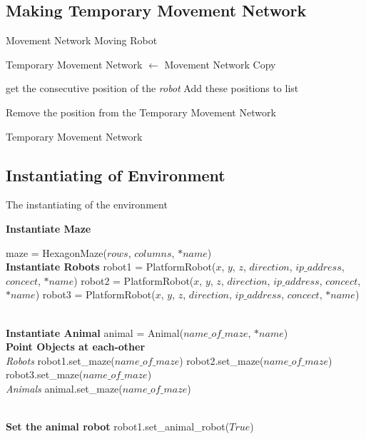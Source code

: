 \subsection{Making Temporary Movement Network}
\label{function:}
\begin{algorithm}
\caption{}
\begin{algorithmic}

\REQUIRE Movement Network
\REQUIRE Moving Robot

\STATE Temporary Movement Network $\leftarrow$ Movement Network Copy 

    \STATE get the consecutive position of the \textit{robot}
    \STATE Add these positions to list
    
       \STATE Remove the position from the Temporary Movement Network
\ENDFOR
\ENDFOR


\RETURN Temporary Movement Network

\end{algorithmic}
\end{algorithm}


\subsection{Instantiating of Environment}
\label{function:instantiation}
\begin{algorithm}[H]
\caption{The instantiating of the environment}

\textbf{Instantiate Maze}

\begin{algorithmic}[1]

\bindent{}
\STATE maze = HexagonMaze($rows$, $columns$, $*name$)
\eindent{}
\\ \textbf{Instantiate Robots}
\bindent{}
\STATE robot1 = PlatformRobot($x$, $y$, $z$, $direction$, $ip\_address$, $concect$, $*name$)
\STATE robot2 = PlatformRobot($x$, $y$, $z$, $direction$, $ip\_address$, $concect$, $*name$)
\STATE robot3 = PlatformRobot($x$, $y$, $z$, $direction$, $ip\_address$, $concect$, $*name$)
\eindent{}

\\ \textbf{Instantiate Animal}
\bindent{}
\STATE animal = Animal($name\_of\_maze$, $*name$)
\eindent{}
\\ \textbf{Point Objects at each-other}
\\ \textit{Robots}
\bindent{}
\STATE robot1.set\_maze($name\_of\_maze$)
\STATE robot2.set\_maze($name\_of\_maze$)
\STATE robot3.set\_maze($name\_of\_maze$)
\eindent{}
\\ \textit{Animals}
\bindent{}
\STATE animal.set\_maze($name\_of\_maze$)
\eindent{}

\\ \textbf{Set the animal robot}
\bindent{}
\STATE robot1.set\_animal\_robot($True$) 
\eindent{}

\end{algorithmic}
\end{algorithm}

